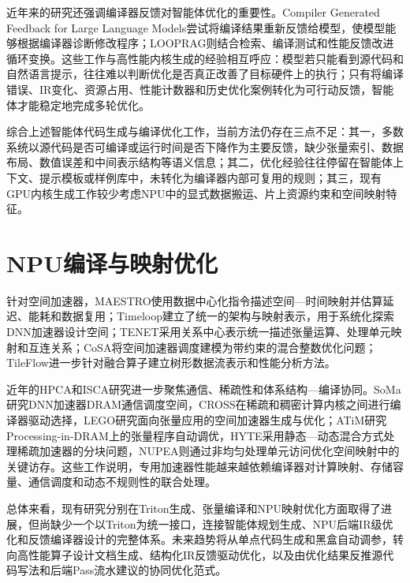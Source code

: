 近年来的研究还强调编译器反馈对智能体优化的重要性。Compiler Generated Feedback for Large Language Models尝试将编译结果重新反馈给模型，使模型能够根据编译器诊断修改程序\citep{grubisic2024feedback}；LOOPRAG则结合检索、编译测试和性能反馈改进循环变换\citep{zhi2026looprag}。这些工作与高性能内核生成的经验相互呼应：模型若只能看到源代码和自然语言提示，往往难以判断优化是否真正改善了目标硬件上的执行；只有将编译错误、IR变化、资源占用、性能计数器和历史优化案例转化为可行动反馈，智能体才能稳定地完成多轮优化。

综合上述智能体代码生成与编译优化工作，当前方法仍存在三点不足：其一，多数系统以源代码是否可编译或运行时间是否下降作为主要反馈，缺少张量索引、数据布局、数值误差和中间表示结构等语义信息；其二，优化经验往往停留在智能体上下文、提示模板或样例库中，未转化为编译器内部可复用的规则；其三，现有GPU内核生成工作较少考虑NPU中的显式数据搬运、片上资源约束和空间映射特征。

\section{NPU编译与映射优化}

针对空间加速器，MAESTRO使用数据中心化指令描述空间—时间映射并估算延迟、能耗和数据复用\citep{kwon2019maestro}；Timeloop建立了统一的架构与映射表示，用于系统化探索DNN加速器设计空间\citep{parashar2019timeloop}；TENET采用关系中心表示统一描述张量运算、处理单元映射和互连关系\citep{lu2021tenet}；CoSA将空间加速器调度建模为带约束的混合整数优化问题\citep{huang2021cosa}；TileFlow进一步针对融合算子建立树形数据流表示和性能分析方法\citep{zheng2023tileflow}。

近年的HPCA和ISCA研究进一步聚焦通信、稀疏性和体系结构—编译协同。SoMa研究DNN加速器DRAM通信调度空间\citep{cai2025soma}，CROSS在稀疏和稠密计算内核之间进行编译器驱动选择\citep{liu2025cross}，LEGO研究面向张量应用的空间加速器生成与优化\citep{lin2025lego}；ATiM研究Processing-in-DRAM上的张量程序自动调优\citep{shin2025atim}，HYTE采用静态—动态混合方式处理稀疏加速器的分块问题\citep{li2025hyte}，NUPEA则通过非均匀处理单元访问优化空间映射中的关键访存\citep{ghosh2025nupea}。这些工作说明，专用加速器性能越来越依赖编译器对计算映射、存储容量、通信调度和动态不规则性的联合处理。

总体来看，现有研究分别在Triton生成、张量编译和NPU映射优化方面取得了进展，但尚缺少一个以Triton为统一接口，连接智能体规划生成、NPU后端IR级优化和反馈编译器设计的完整体系。未来趋势将从单点代码生成和黑盒自动调参，转向高性能算子设计文档生成、结构化IR反馈驱动优化，以及由优化结果反推源代码写法和后端Pass流水建议的协同优化范式。

